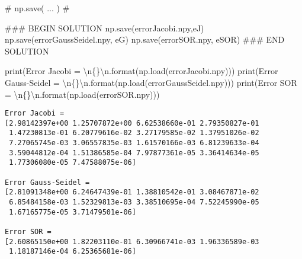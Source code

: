 \documentclass[
  letterpaper,
  DIV=11,
  numbers=noendperiod]{scrreprt}
\newenvironment{Shaded}{\begin{snugshade}}{\end{snugshade}}
\newcommand{\BuiltInTok}[1]{\textcolor[rgb]{0.00,0.23,0.31}{#1}}
\newcommand{\CharTok}[1]{\textcolor[rgb]{0.13,0.47,0.30}{#1}}
\newcommand{\CommentTok}[1]{\textcolor[rgb]{0.37,0.37,0.37}{#1}}
\newcommand{\NormalTok}[1]{\textcolor[rgb]{0.00,0.23,0.31}{#1}}
\newcommand{\RegionMarkerTok}[1]{\textcolor[rgb]{0.00,0.23,0.31}{#1}}
\newcommand{\SpecialCharTok}[1]{\textcolor[rgb]{0.37,0.37,0.37}{#1}}
\newcommand{\StringTok}[1]{\textcolor[rgb]{0.13,0.47,0.30}{#1}}
\begin{document}
\begin{Shaded}
\begin{Highlighting}[]
\CommentTok{\# np.save( ... )}
\CommentTok{\#}

\CommentTok{\#\#\# }\RegionMarkerTok{BEGIN}\CommentTok{ SOLUTION}
\NormalTok{np.save(}\StringTok{\textquotesingle{}errorJacobi.npy\textquotesingle{}}\NormalTok{,eJ)}
\NormalTok{np.save(}\StringTok{\textquotesingle{}errorGaussSeidel.npy\textquotesingle{}}\NormalTok{, eG)}
\NormalTok{np.save(}\StringTok{\textquotesingle{}errorSOR.npy\textquotesingle{}}\NormalTok{, eSOR)}
\CommentTok{\#\#\# }\RegionMarkerTok{END}\CommentTok{ SOLUTION}
\end{Highlighting}
\end{Shaded}

\begin{Shaded}
\begin{Highlighting}[]
\BuiltInTok{print}\NormalTok{(}\StringTok{\textquotesingle{}Error Jacobi = }\CharTok{\textbackslash{}n}\SpecialCharTok{\{\}}\CharTok{\textbackslash{}n}\StringTok{\textquotesingle{}}\NormalTok{.}\BuiltInTok{format}\NormalTok{(np.load(}\StringTok{\textquotesingle{}errorJacobi.npy\textquotesingle{}}\NormalTok{)))}
\BuiltInTok{print}\NormalTok{(}\StringTok{\textquotesingle{}Error Gauss{-}Seidel = }\CharTok{\textbackslash{}n}\SpecialCharTok{\{\}}\CharTok{\textbackslash{}n}\StringTok{\textquotesingle{}}\NormalTok{.}\BuiltInTok{format}\NormalTok{(np.load(}\StringTok{\textquotesingle{}errorGaussSeidel.npy\textquotesingle{}}\NormalTok{)))}
\BuiltInTok{print}\NormalTok{(}\StringTok{\textquotesingle{}Error SOR = }\CharTok{\textbackslash{}n}\SpecialCharTok{\{\}}\CharTok{\textbackslash{}n}\StringTok{\textquotesingle{}}\NormalTok{.}\BuiltInTok{format}\NormalTok{(np.load(}\StringTok{\textquotesingle{}errorSOR.npy\textquotesingle{}}\NormalTok{)))}
\end{Highlighting}
\end{Shaded}

\begin{verbatim}
Error Jacobi = 
[2.98142397e+00 1.25707872e+00 6.62538660e-01 2.79350827e-01
 1.47230813e-01 6.20779616e-02 3.27179585e-02 1.37951026e-02
 7.27065745e-03 3.06557835e-03 1.61570166e-03 6.81239633e-04
 3.59044812e-04 1.51386585e-04 7.97877361e-05 3.36414634e-05
 1.77306080e-05 7.47588075e-06]

Error Gauss-Seidel = 
[2.81091348e+00 6.24647439e-01 1.38810542e-01 3.08467871e-02
 6.85484158e-03 1.52329813e-03 3.38510695e-04 7.52245990e-05
 1.67165775e-05 3.71479501e-06]

Error SOR = 
[2.60865150e+00 1.82203110e-01 6.30966741e-03 1.96336589e-03
 1.18187146e-04 6.25365681e-06]
\end{verbatim}
\end{document}
